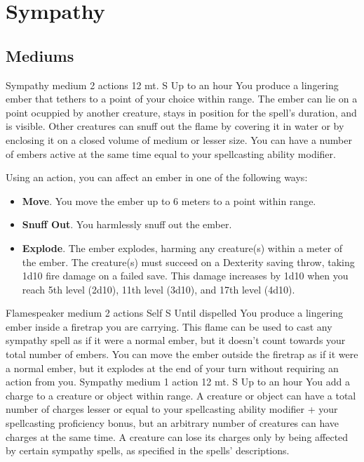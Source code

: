 \section{Sympathy}
\subsection*{Mediums}
        {Sympathy medium}
        {2 actions}
        {12 mt.}
        {S}
        {Up to an hour}
        You produce a lingering ember that tethers to a point of your choice within range.
        The ember can lie on a point ocuppied by another creature, stays in position for the spell's duration, and is visible.
        Other creatures can snuff out the flame by covering it in water or by enclosing it on a closed volume of medium or lesser size.
        You can have a number of embers active at the same time equal to your spellcasting ability modifier.

        Using an action, you can affect an ember in one of the following ways:
        \begin{itemize}
            \item \textbf{Move}.
            You move the ember up to 6 meters to a point within range.
            \item \textbf{Snuff Out}.
            You harmlessly snuff out the ember.
            \item \textbf{Explode}.
            The ember explodes, harming any creature(s) within a meter of the ember.
            The creature(s) must succeed on a Dexterity saving throw, taking 1d10 fire damage on a failed save.
            This damage increases by 1d10 when you reach 5th level (2d10), 11th level (3d10), and 17th level (4d10).
        \end{itemize}
        {Flamespeaker medium}
        {2 actions}
        {Self}
        {S}
        {Until dispelled}
        You produce a lingering ember inside a firetrap you are carrying.
        This flame can be used to cast any sympathy spell as if it were a normal ember, but it doesn't count towards your total number of embers.
        You can move the ember outside the firetrap as if it were a normal ember, but it explodes at the end of your turn without requiring an action from you.
        {Sympathy medium}
        {1 action}
        {12 mt.}
        {S}
        {Up to an hour}
        You add a charge to a creature or object within range.
        A creature or object can have a total number of charges lesser or equal to your spellcasting ability modifier + your spellcasting proficiency bonus, but an arbitrary number of creatures can have charges at the same time.
        A creature can lose its charges only by being affected by certain sympathy spells, as specified in the spells' descriptions.

